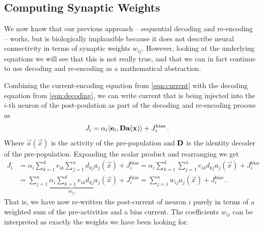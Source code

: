 \documentclass[10pt,letterpaper,oneside]{article}
\begin{document}
	\subsection{Computing Synaptic Weights}

	We now know that our previous approach -- sequential decoding and re-encoding -- works, but is biologically implausible because it does not describe neural connectivity in terms of synaptic weights $w_{ij}$. However, looking at the underlying equations we will see that this is not really true, and that we can in fact continue to use decoding and re-encoding as a mathematical abstraction.

	Combining the current-encoding equation from \cref{eqn:current} with the decoding equation from \cref{eqn:decoding}, we can write current that is being injected into the $i$-th neuron of the post-poulation as part of the decoding and re-encoding process as
	\begin{align*}
		J_i &= \alpha_i \langle {\mathbf{e}}_i, {\mathbf{D}} {\mathbf{a}}({\mathbf{x}}) \rangle + J^\mathrm{bias}_i \,.
	\end{align*}
	Where $\vec a(\vec x)$ is the activity of the pre-population and ${\mathbf{D}}$ is the identity decoder of the pre-population. Expanding the scalar product and rearranging we get
	\begin{align*}
		J_i &= \alpha_i \sum_{k=1}^d e_{ik} \sum_{j=1}^n d_{kj} a_j(\vec x) + J^\mathrm{bias}_i
		     = \alpha_i \sum_{k=1}^d \sum_{j=1}^n e_{ik} d_{kj} a_j(\vec x) + J^\mathrm{bias}_i \\
		    &= \sum_{j=1}^n \underbrace{\alpha_i  \sum_{k=1}^d e_{ik} d_{kj}}_{w_{ij}} a_j(\vec x) + J^\mathrm{bias}_i
		     = \sum_{j=1}^n w_{ij} a_j(\vec x) + J^\mathrm{bias}_i \,.
	\end{align*}
	That is, we have now re-written the post-current of neuron $i$ purely in terms of a weighted sum of the pre-activities and a bias current. The coefficients $w_{ij}$ can be interpreted as exactly the weights we have been looking for.
\end{document}
